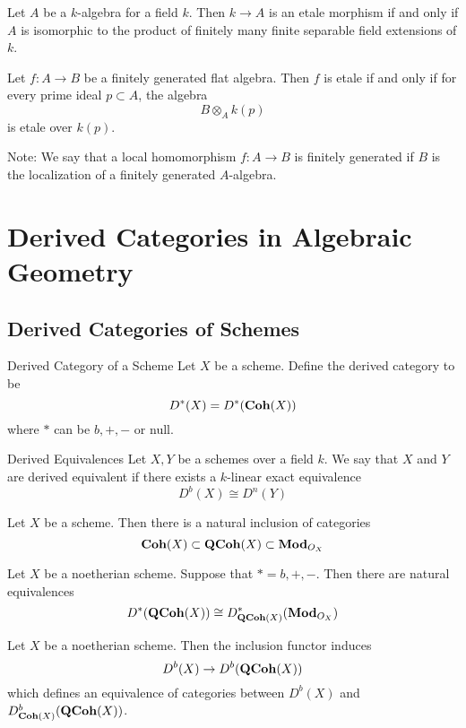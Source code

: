 \documentclass[a4paper]{article}
\begin{document}
\begin{prp}{}{} Let $A$ be a $k$-algebra for a field $k$. Then $k\to A$ is an etale morphism if and only if $A$ is isomorphic to the product of finitely many finite separable field extensions of $k$. 
\end{prp}

\begin{prp}{}{} Let $f:A\to B$ be a finitely generated flat algebra. Then $f$ is etale if and only if for every prime ideal $p\subset A$, the algebra $$B\otimes_A k(p)$$ is etale over $k(p)$. 
\end{prp}

Note: We say that a local homomorphism $f:A\to B$ is finitely generated if $B$ is the localization of a finitely generated $A$-algebra. 


\pagebreak
\section{Derived Categories in Algebraic Geometry}
\subsection{Derived Categories of Schemes}
\begin{defn}{Derived Category of a Scheme}{} Let $X$ be a scheme. Define the derived category to be $$D^\ast(X)=D^\ast(\bold{Coh}(X))$$ where $\ast$ can be $b,+,-$ or null. 
\end{defn}

\begin{defn}{Derived Equivalences}{} Let $X,Y$ be a schemes over a field $k$. We say that $X$ and $Y$ are derived equivalent if there exists a $k$-linear exact equivalence $$D^b(X)\cong D^n(Y)$$
\end{defn}

Let $X$ be a scheme. Then there is a natural inclusion of categories $$\bold{Coh}(X)\subset\bold{QCoh}(X)\subset\bold{Mod}_{O_X}$$

\begin{prp}{}{} Let $X$ be a noetherian scheme. Suppose that $\ast=b,+,-$. Then there are natural equivalences $$D^\ast(\bold{QCoh}(X))\cong D_{\bold{QCoh}(X)}^\ast(\bold{Mod}_{O_X})$$
\end{prp}

\begin{prp}{}{} Let $X$ be a noetherian scheme. Then the inclusion functor induces $$D^b(X)\to D^b(\bold{QCoh}(X))$$ which defines an equivalence of categories between $D^b(X)$ and $D_{\bold{Coh}(X)}^b(\bold{QCoh}(X))$. 
\end{prp}
\end{document}
